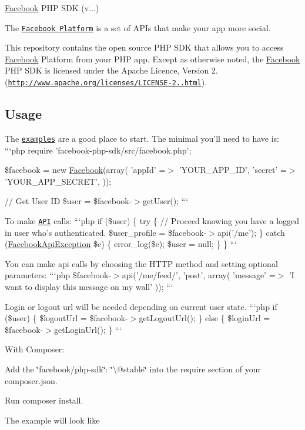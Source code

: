 \hyperlink{class_facebook}{Facebook} P\-H\-P S\-D\-K (v...)

The \href{http://developers.facebook.com/}{\tt Facebook Platform} is a set of A\-P\-Is that make your app more social.

This repository contains the open source P\-H\-P S\-D\-K that allows you to access \hyperlink{class_facebook}{Facebook} Platform from your P\-H\-P app. Except as otherwise noted, the \hyperlink{class_facebook}{Facebook} P\-H\-P S\-D\-K is licensed under the Apache Licence, Version 2. (\href{http://www.apache.org/licenses/LICENSE-2.0.html}{\tt http\-://www.\-apache.\-org/licenses/\-L\-I\-C\-E\-N\-S\-E-\/2..\-html}).

\subsection*{Usage }

The \href{/examples/example.php}{\tt examples} are a good place to start. The minimal you'll need to have is\-: ```php require 'facebook-\/php-\/sdk/src/facebook.\-php';

\$facebook = new \hyperlink{class_facebook}{Facebook}(array( 'app\-Id' =$>$ 'Y\-O\-U\-R\-\_\-\-A\-P\-P\-\_\-\-I\-D', 'secret' =$>$ 'Y\-O\-U\-R\-\_\-\-A\-P\-P\-\_\-\-S\-E\-C\-R\-E\-T', ));

// Get User I\-D \$user = \$facebook-\/$>$get\-User(); ```

To make \href{http://developers.facebook.com/docs/api}{\tt A\-P\-I} calls\-: ```php if (\$user) \{ try \{ // Proceed knowing you have a logged in user who's authenticated. \$user\-\_\-profile = \$facebook-\/$>$api('/me'); \} catch (\hyperlink{class_facebook_api_exception}{Facebook\-Api\-Exception} \$e) \{ error\-\_\-log(\$e); \$user = null; \} \} ```

You can make api calls by choosing the {\ttfamily H\-T\-T\-P method} and setting optional {\ttfamily parameters}\-: ```php \$facebook-\/$>$api('/me/feed/', 'post', array( 'message' =$>$ 'I want to display this message on my wall' )); ```

Login or logout url will be needed depending on current user state. ```php if (\$user) \{ \$logout\-Url = \$facebook-\/$>$get\-Logout\-Url(); \} else \{ \$login\-Url = \$facebook-\/$>$get\-Login\-Url(); \} ```

With Composer\-:


\begin{DoxyItemize}
\item Add the {\ttfamily \char`\"{}facebook/php-\/sdk\char`\"{}\-: \char`\"{}\textbackslash{}@stable\char`\"{}} into the {\ttfamily require} section of your {\ttfamily composer.\-json}.
\item Run {\ttfamily composer install}.
\item The example will look like
\end{DoxyItemize}

